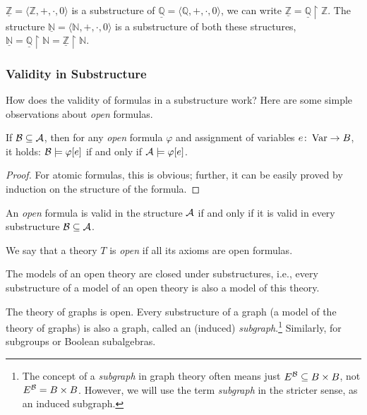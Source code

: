 \begin{example}
    $\underline{\mathbb Z}=\langle\mathbb Z,+,\cdot,0\rangle$ is a substructure of $\underline{\mathbb Q}=\langle\mathbb Q,+,\cdot,0\rangle$, we can write $\underline{\mathbb Z}=\underline{\mathbb Q}\restriction\mathbb Z$. The structure $\underline{\mathbb N}=\langle \mathbb N,+,\cdot,0\rangle$ is a substructure of both these structures, $\underline{\mathbb N}=\underline{\mathbb Q}\restriction\mathbb N=\underline{\mathbb Z}\restriction\mathbb N$.
\end{example}

\subsubsection{Validity in Substructure}

How does the validity of formulas in a substructure work? Here are some simple observations about \emph{open} formulas.

\begin{observation}
    If $\mathcal{B}\subseteq\mathcal{A}$, then for any \emph{open} formula $\varphi$ and assignment of variables $e\colon\operatorname{Var}\to B$, it holds: $\mathcal{B}\models\varphi[e]$ if and only if $\mathcal{A}\models\varphi[e]$.
\end{observation}
\begin{proof}
    For atomic formulas, this is obvious; further, it can be easily proved by induction on the structure of the formula.
\end{proof}

\begin{corollary}
    An \emph{open} formula is valid in the structure $\mathcal{A}$ if and only if it is valid in every substructure $\mathcal{B}\subseteq\mathcal{A}$.
\end{corollary}

We say that a theory $T$ is \emph{open} if all its axioms are open formulas.

\begin{corollary}
    The models of an open theory are closed under substructures, i.e., every substructure of a model of an open theory is also a model of this theory.
\end{corollary}

\begin{example}
    The theory of graphs is open. Every substructure of a graph (a model of the theory of graphs) is also a graph, called an (induced) \emph{subgraph}.\footnote{The concept of a \emph{subgraph} in graph theory often means just $E^{\mathcal{B}}\subseteq B\times B$, not $E^{\mathcal{B}}=B\times B$. However, we will use the term \emph{subgraph} in the stricter sense, as an induced subgraph.} Similarly, for subgroups or Boolean subalgebras.
\end{example}

